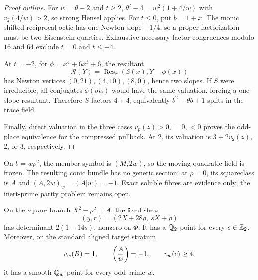 \begin{proof}[Proof outline]
For \(w=\theta-2\) and \(t\ge2\),
\(\theta^2-4=w^2(1+4/w)\) with \(v_2(4/w)>2\), so strong Hensel applies.
For \(t\le0\), put \(b=1+x\).  The monic shifted reciprocal octic has
one Newton slope \(-1/4\), so a proper factorization must be two
Eisenstein quartics.  Exhaustive necessary factor congruences modulo
\(16\) and \(64\) exclude \(t=0\) and \(t\le-4\).

At \(t=-2\), for
\(\phi=x^4+6x^3+6\), the resultant
\[
 \mathcal R(Y)=\operatorname{Res}_x(S(x),Y-\phi(x))
\]
has Newton vertices \((0,21),(4,10),(8,0)\), hence two slopes.
If \(S\) were irreducible, all conjugates \(\phi(\sigma\alpha)\) would
have the same valuation, forcing a one-slope resultant.  Therefore
\(S\) factors \(4+4\), equivalently
\(b^2-\theta b+1\) splits in the trace field.

Finally, direct valuation in the three cases \(v_p(z)>0,=0,<0\) proves
the odd-place equivalence for the compressed pullback.  At \(2\), its
valuation is \(3+2v_2(z)\), \(2\), or \(3\), respectively.
\end{proof}

\begin{remark}
On \(b=w\rho^2\), the member symbol is \((M,2w)\), so the moving
quadratic field is frozen.  The resulting conic bundle has no generic
section: at \(\rho=0\), its squareclass is \(A\) and
\((A,2w)_w=(A|w)=-1\).  Exact soluble fibres are evidence only; the
inert-prime parity problem remains open.
\end{remark}


\begin{theorem}
\label{thm:triangularshear}
On the square branch \(X^2-\rho^2=A\), the fixed shear
\[
 (y,r)=(2X+28\rho,\ sX+\rho)
\]
has determinant \(2(1-14s)\), nonzero on \(\Phi\).  It has a
\(\mathbb{Q}_2\)-point for every \(s\in\mathbb{Z}_2\).  Moreover, on the standard
aligned target stratum
\[
 v_w(B)=1,\qquad \left(\frac{A}{w}\right)=-1,\qquad v_w(c)\ge4,
\]
it has a smooth \(\mathbb{Q}_w\)-point for every odd prime \(w\).
\end{theorem}

